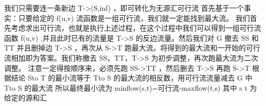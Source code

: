 {}我们只需要连一条新边\markdownRendererDollarSign{} T->(S,inf) \markdownRendererDollarSign{}，即可转化为无源汇可行流\markdownRendererInterblockSeparator
{}
\markdownRendererSectionEnd \markdownRendererSectionBegin
{}\markdownRendererInterblockSeparator
{}首先基于一个事实：只要给定的\markdownRendererDollarSign{} f(u,v) \markdownRendererDollarSign{}流函数是一组可行流，我们就一定能找到最大流。\markdownRendererParagraphSeparator
{}我们首先考虑求出可行流，也就是执行上述过程，在这个过程中我们可以得到一组可行流函数\markdownRendererDollarSign{} f(u,v) \markdownRendererDollarSign{},并且此时已有的流量是\markdownRendererDollarSign{} T->S \markdownRendererDollarSign{}的反边流量。然后我们对\markdownRendererDollarSign{} G \markdownRendererDollarSign{}撤去\markdownRendererDollarSign{} SS \markdownRendererDollarSign{}和\markdownRendererDollarSign{} TT \markdownRendererDollarSign{}并且删掉边\markdownRendererDollarSign{} T->S \markdownRendererDollarSign{}，再次从\markdownRendererDollarSign{} S->T \markdownRendererDollarSign{}跑最大流。将得到的最大流和一开始的可行流相加即为答案。我们称撤去\markdownRendererDollarSign{} SS，TT，T->S \markdownRendererDollarSign{}为初步调整，再次跑最大流为二次调整。\markdownRendererParagraphSeparator
{}注意一定得按顺序来，必须先跑\markdownRendererDollarSign{} SS->TT \markdownRendererDollarSign{}，然后删去\markdownRendererDollarSign{} T->S \markdownRendererDollarSign{}再跑\markdownRendererDollarSign{} S->T \markdownRendererDollarSign{}\markdownRendererInterblockSeparator
{}\markdownRendererInterblockSeparator
{}
\markdownRendererSectionEnd \markdownRendererSectionBegin
{}\markdownRendererInterblockSeparator
{}根据结论 \markdownRendererDollarSign{}S\markdownRendererBackslash{}to T\markdownRendererDollarSign{} 的最小流等于 \markdownRendererDollarSign{}T\markdownRendererBackslash{}to S\markdownRendererDollarSign{} 的最大流的相反数，用可行流流量减去 \markdownRendererDollarSign{}G\markdownRendererDollarSign{} 中 \markdownRendererDollarSign{}T\markdownRendererBackslash{}to S\markdownRendererDollarSign{} 的最大流\markdownRendererParagraphSeparator
{}所以最终最小流为\markdownRendererDollarSign{} minflow(s,t)=可行流-maxflow(t,s) \markdownRendererDollarSign{}\markdownRendererParagraphSeparator
{}其中\markdownRendererDollarSign{} s \markdownRendererBackslash{} t \markdownRendererDollarSign{}为给定的源和汇\markdownRendererInterblockSeparator
{}
\markdownRendererSectionEnd \markdownRendererSectionBegin

